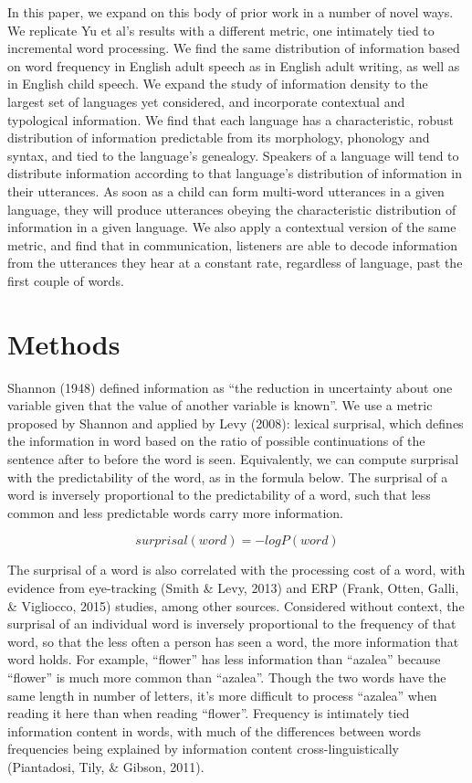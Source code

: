 \documentclass[11pt,]{article}
\begin{document}
In this paper, we expand on this body of prior work in a number of novel ways. We replicate Yu et al's results with a different metric, one intimately tied to incremental word processing. We find the same distribution of information based on word frequency in English adult speech as in English adult writing, as well as in English child speech. We expand the study of information density to the largest set of languages yet considered, and incorporate contextual and typological information. We find that each language has a characteristic, robust distribution of information predictable from its morphology, phonology and syntax, and tied to the language's genealogy. Speakers of a language will tend to distribute information according to that language's distribution of information in their utterances. As soon as a child can form multi-word utterances in a given language, they will produce utterances obeying the characteristic distribution of information in a given language. We also apply a contextual version of the same metric, and find that in communication, listeners are able to decode information from the utterances they hear at a constant rate, regardless of language, past the first couple of words.

\hypertarget{methods}{%
\section{Methods}\label{methods}}

Shannon (1948) defined information as ``the reduction in uncertainty about one variable given that the value of another variable is known''. We use a metric proposed by Shannon and applied by Levy (2008): lexical surprisal, which defines the information in word based on the ratio of possible continuations of the sentence after to before the word is seen. Equivalently, we can compute surprisal with the predictability of the word, as in the formula below. The surprisal of a word is inversely proportional to the predictability of a word, such that less common and less predictable words carry more information.

\[surprisal(word) = -log P(word)\]

The surprisal of a word is also correlated with the processing cost of a word, with evidence from eye-tracking (Smith \& Levy, 2013) and ERP (Frank, Otten, Galli, \& Vigliocco, 2015) studies, among other sources. Considered without context, the surprisal of an individual word is inversely proportional to the frequency of that word, so that the less often a person has seen a word, the more information that word holds. For example, ``flower'' has less information than ``azalea'' because ``flower'' is much more common than ``azalea''. Though the two words have the same length in number of letters, it's more difficult to process ``azalea'' when reading it here than when reading ``flower''. Frequency is intimately tied information content in words, with much of the differences between words frequencies being explained by information content cross-linguistically (Piantadosi, Tily, \& Gibson, 2011).
\end{document}
